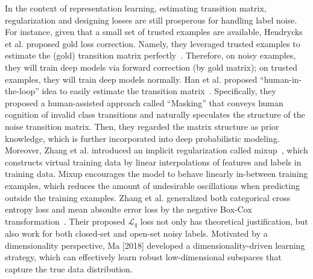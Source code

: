 In the context of representation learning, estimating transition matrix, regularization and designing losses are still prosperous for handling label noise. For instance, given that a small set of trusted examples are available, Hendrycks et al. proposed gold loss correction. Namely, they leveraged trusted examples to estimate the (gold) transition matrix perfectly~. Therefore, on noisy examples, they will train deep models via forward correction (by gold matrix); on trusted examples, they will train deep models normally. Han et al. proposed ``human-in-the-loop'' idea to easily estimate the transition matrix~. Specifically, they proposed a human-assisted approach called ``Masking'' that conveys human cognition of invalid class transitions and naturally speculates the structure of the noise transition matrix. Then, they regarded the matrix structure as prior knowledge, which is further incorporated into deep probabilistic modeling.
Moreover, Zhang et al. introduced an implicit regularization called mixup~, which constructs virtual training data by linear interpolations of features and labels in training data. Mixup encourages the model to behave linearly in-between training examples, which reduces the amount of undesirable oscillations when predicting outside the training examples. Zhang et al. generalized both categorical cross entropy loss and mean absoulte error loss by the negative Box-Cox transformation~. Their proposed $\mathcal{L}_q$ loss not only has theoretical justification, but also work for both closed-set and open-set noisy labels. Motivated by a dimensionality perspective, Ma [2018] developed a dimensionality-driven learning strategy, which can effectively learn robust low-dimensional subspaces that capture the true data distribution.

